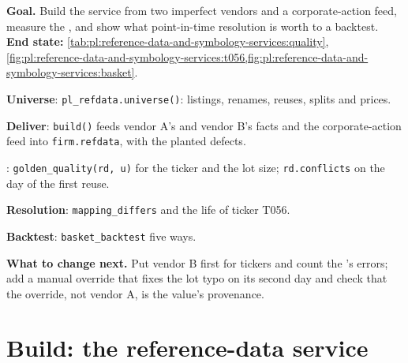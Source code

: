 \begin{tutorial}
\textbf{Goal.} Build the service from two imperfect vendors and a corporate-action feed, measure the , and show what
point-in-time resolution is worth to a backtest. \textbf{End state:} \cref{tab:pl:reference-data-and-symbology-services:quality},
\cref{fig:pl:reference-data-and-symbology-services:t056,fig:pl:reference-data-and-symbology-services:basket}.
\begin{tutsteps}
\item \textbf{Universe}: \texttt{pl\_refdata.universe()}: listings, renames, reuses, splits and prices.
\item \textbf{Deliver}: \texttt{build()} feeds vendor A's and vendor B's facts and the corporate-action feed into
\texttt{firm.refdata}, with the planted defects.
\item \textbf{}: \texttt{golden\_quality(rd, u)} for the ticker and the lot size; \texttt{rd.conflicts} on the day of
the first reuse.
\item \textbf{Resolution}: \texttt{mapping\_differs} and the life of ticker T056.
\item \textbf{Backtest}: \texttt{basket\_backtest} five ways.
\end{tutsteps}
\textbf{What to change next.} Put vendor B first for tickers and count the 's errors; add a manual override that fixes
the lot typo on its second day and check that the override, not vendor A, is the value's provenance.
\end{tutorial}

\section{Build: the reference-data service}\label{bld:pl:reference-data-and-symbology-services:refdata}

